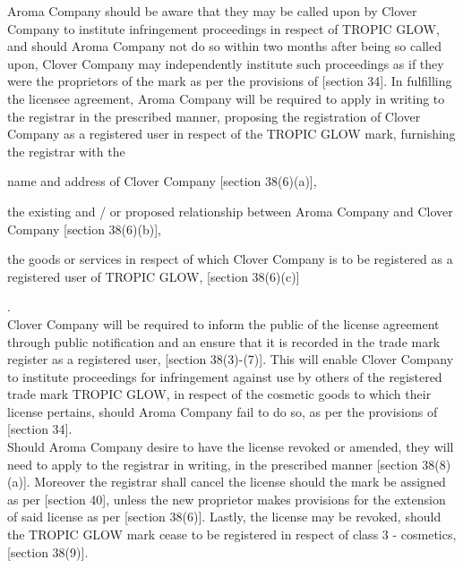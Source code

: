 \documentclass[11pt]{article}
\begin{document}
Aroma Company should be aware that they may be called upon by Clover Company to
institute infringement proceedings in respect of TROPIC GLOW, and should Aroma
Company not do so within two months after being so called upon, Clover Company
may independently institute such proceedings as if they were the proprietors of
the mark as per the provisions of [section 34]\cite{rsa93_tm_act}. In fulfilling
the licensee agreement, Aroma Company will be required to apply in writing to
the registrar in the prescribed manner, proposing the registration of Clover
Company as a registered user in respect of the TROPIC GLOW mark, furnishing the
registrar with the \begin{enumerate*}[label=(\roman*)]\item name and address of
Clover Company [section 38(6)(a)]\cite{rsa93_tm_act}, \item the existing and / or
proposed relationship between Aroma Company and Clover Company [section
38(6)(b)]\cite{rsa93_tm_act}, \item the goods or services in respect of which
Clover Company is to be registered as a registered user of TROPIC GLOW, [section
38(6)(c)]\cite{rsa93_tm_act} \end{enumerate*}.\\

Clover Company will be required to inform the public of the license agreement
through public notification and an ensure that it is recorded in the trade mark
register as a registered user, [section 38(3)-(7)]\cite{rsa93_tm_act}. This will
enable Clover Company to institute proceedings for infringement against use by
others of the registered trade mark TROPIC GLOW, in respect of the cosmetic
goods to which their license pertains, should Aroma Company fail to do so, as
per the provisions of [section 34]\cite{rsa93_tm_act}.\\

Should Aroma Company desire to have the license revoked or amended, they will
need to apply to the registrar in writing, in the prescribed manner [section
38(8)(a)]\cite{rsa93_tm_act}. Moreover the registrar shall cancel the license
should the mark be assigned as per [section 40]\cite{rsa93_tm_act}, unless the new
proprietor makes provisions for the extension of said license as per [section
38(6)]\cite{rsa93_tm_act}. Lastly, the license may be revoked, should the TROPIC
GLOW mark cease to be registered in respect of class 3 - cosmetics, [section
38(9)]\cite{rsa93_tm_act}.

\printbibliography
\end{document}
